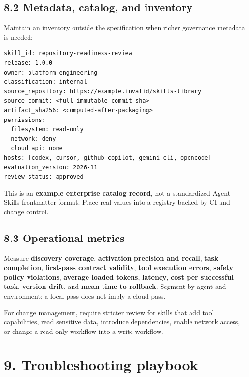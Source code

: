 \documentclass[
  10pt,
  letterpaper,
]{article}
\begin{document}
\subsection{8.2 Metadata, catalog, and
inventory}\label{metadata-catalog-and-inventory}

Maintain an inventory outside the specification when richer governance
metadata is needed:

\begin{lstlisting}
skill_id: repository-readiness-review
release: 1.0.0
owner: platform-engineering
classification: internal
source_repository: https://example.invalid/skills-library
source_commit: <full-immutable-commit-sha>
artifact_sha256: <computed-after-packaging>
permissions:
  filesystem: read-only
  network: deny
  cloud_api: none
hosts: [codex, cursor, github-copilot, gemini-cli, opencode]
evaluation_version: 2026-11
review_status: approved
\end{lstlisting}

This is an \textbf{example enterprise catalog record}, not a
standardized Agent Skills frontmatter format. Place real values into a
registry backed by CI and change control.

\subsection{8.3 Operational metrics}\label{operational-metrics}

Measure \textbf{discovery coverage}, \textbf{activation precision and
recall}, \textbf{task completion}, \textbf{first-pass contract
validity}, \textbf{tool execution errors}, \textbf{safety policy
violations}, \textbf{average loaded tokens}, \textbf{latency},
\textbf{cost per successful task}, \textbf{version drift}, and
\textbf{mean time to rollback}. Segment by agent and environment; a
local pass does not imply a cloud pass.

For change management, require stricter review for skills that add tool
capabilities, read sensitive data, introduce dependencies, enable
network access, or change a read-only workflow into a write workflow.

\section{9. Troubleshooting playbook}\label{troubleshooting-playbook}
\end{document}
